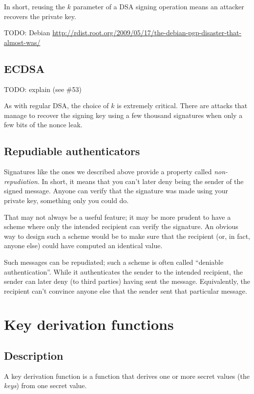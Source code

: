 \documentclass[11pt,ebook,table,dvipsnames]{memoir}
\begin{document}
In short, reusing the $k$ parameter of a DSA signing operation means
an attacker recovers the private key.

TODO: Debian \url{http://rdist.root.org/2009/05/17/the-debian-pgp-disaster-that-almost-was/}
\section{ECDSA}
\label{sec-2-8-4}

TODO: explain (see \#53)

As with regular DSA, the choice of $k$ is extremely critical. There
are attacks that manage to recover the signing key using a few
thousand signatures when only a few bits of the nonce leak.
\cite{demulder:ecdsa}
\section{Repudiable authenticators}
\label{sec-2-8-5}

Signatures like the ones we described above provide a property called
\emph{non-repudiation}. In short, it means that you can't later deny being
the sender of the signed message. Anyone can verify that the signature
was made using your private key, something only you could do.

That may not always be a useful feature; it may be more prudent to
have a scheme where only the intended recipient can verify the
signature. An obvious way to design such a scheme would be to make
sure that the recipient (or, in fact, anyone else) could have
computed an identical value.

Such messages can be repudiated; such a scheme is often called
\enquote{deniable authentication}. While it authenticates the sender to the
intended recipient, the sender can later deny (to third parties)
having sent the message. Equivalently, the recipient can't convince
anyone else that the sender sent that particular message.
\chapter{Key derivation functions\label{key-derivation-function}}
\label{sec-2-9}

\section{Description}
\label{sec-2-9-1}

A key derivation function is a function that derives one or more
secret values (the \emph{keys}) from one secret value.
\end{document}
